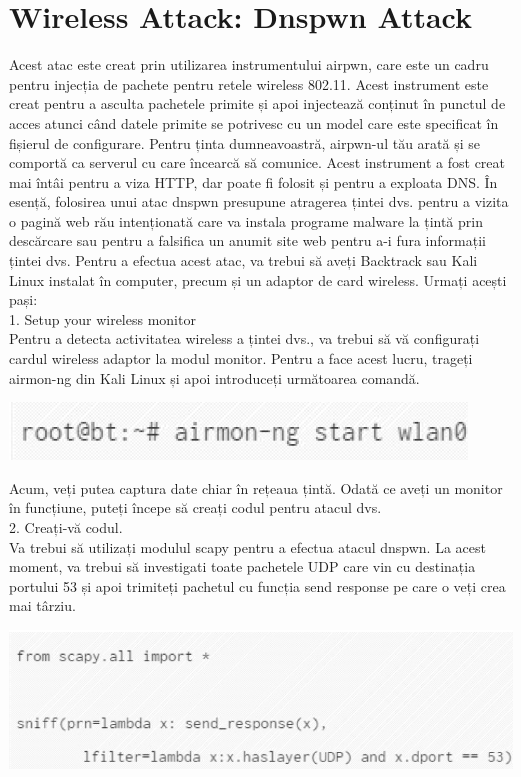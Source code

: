 \documentclass[oneside,20pt]{article}          %
\begin{document}
\section{Wireless Attack: Dnspwn Attack}
Acest atac este creat prin utilizarea instrumentului airpwn, care este un cadru pentru injecția de pachete pentru
retele wireless 802.11. Acest instrument este creat pentru a asculta pachetele primite și apoi injectează conținut în
punctul de acces atunci când datele primite se potrivesc cu un model care este specificat în fișierul de configurare. Pentru ținta dumneavoastră, airpwn-ul tău arată și se comportă ca serverul cu care încearcă să comunice. Acest instrument
a fost creat mai întâi pentru a viza HTTP, dar poate fi folosit și pentru a exploata DNS.
În esență, folosirea unui atac dnspwn presupune atragerea țintei dvs. pentru a vizita o pagină web rău intenționată care
va instala programe malware la țintă prin descărcare sau pentru a falsifica un anumit site web pentru a-i fura
informații țintei dvs. Pentru a efectua acest atac, va trebui să aveți Backtrack sau Kali Linux
instalat în computer, precum și un adaptor de card wireless.
Urmați acești pași:\\
1. Setup your wireless monitor\\
Pentru a detecta activitatea wireless a țintei dvs., va trebui să vă configurați cardul wireless
adaptor la modul monitor. Pentru a face acest lucru, trageți airmon-ng din Kali Linux și apoi introduceți
următoarea comandă.\\
\begin{center}
\includegraphics[height=0.5 cm]{3.png}
\end{center}
Acum, veți putea captura date chiar în rețeaua țintă.
Odată ce aveți un monitor în funcțiune, puteți începe să creați codul pentru atacul dvs.\\
2. Creați-vă codul.\\
Va trebui să utilizați modulul scapy pentru a efectua atacul dnspwn. La
acest moment, va trebui să investigati toate pachetele UDP care vin cu destinația portului 53
și apoi trimiteți pachetul cu funcția send response pe care o veți crea mai târziu.\\
\begin{center}
\includegraphics[height=2 cm]{4.png}
\end{center}
\end{document}
